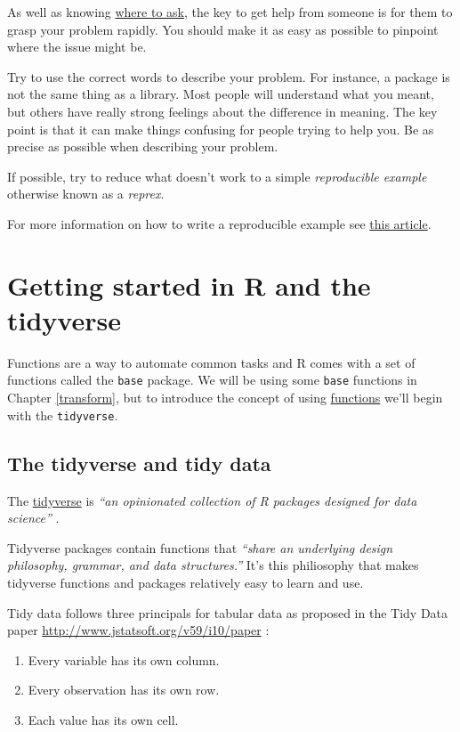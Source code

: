 \documentclass[12pt,]{book}
\providecommand{\tightlist}{%
  \setlength{\itemsep}{0pt}\setlength{\parskip}{0pt}}
\theoremstyle{definition}
\theoremstyle{definition}
\theoremstyle{definition}
\theoremstyle{remark}
\begin{document}
As well as knowing
\href{https://www.tidyverse.org/help/\#where-to-ask}{where to ask}, the
key to get help from someone is for them to grasp your problem rapidly.
You should make it as easy as possible to pinpoint where the issue might
be.

Try to use the correct words to describe your problem. For instance, a
package is not the same thing as a library. Most people will understand
what you meant, but others have really strong feelings about the
difference in meaning. The key point is that it can make things
confusing for people trying to help you. Be as precise as possible when
describing your problem.

If possible, try to reduce what doesn't work to a simple
\emph{reproducible example} otherwise known as a \emph{reprex}.

For more information on how to write a reproducible example see
\href{https://www.tidyverse.org/help/\#reprex}{this article}.

\chapter{Getting started in R and the tidyverse}\label{tidyverse}

Functions are a way to automate common tasks and R comes with a set of
functions called the \texttt{base} package. We will be using some
\texttt{base} functions in Chapter \ref{transform}, but to introduce the
concept of using \protect\hyperlink{function-anatomy}{functions} we'll
begin with the \texttt{tidyverse}.

\section{The tidyverse and tidy data}\label{the-tidyverse-and-tidy-data}

The \href{https://www.tidyverse.org/}{tidyverse} \citep{R-tidyverse} is
\emph{``an opinionated collection of R packages designed for data
science''} .

Tidyverse packages contain functions that \emph{``share an underlying
design philosophy, grammar, and data structures.''} It's this
philiosophy that makes tidyverse functions and packages relatively easy
to learn and use.

Tidy data follows three principals for tabular data as proposed in the
Tidy Data paper \url{http://www.jstatsoft.org/v59/i10/paper} :

\begin{enumerate}
\def\labelenumi{\arabic{enumi}.}
\tightlist
\item
  Every variable has its own column.
\item
  Every observation has its own row.
\item
  Each value has its own cell.
\end{enumerate}
\end{document}
